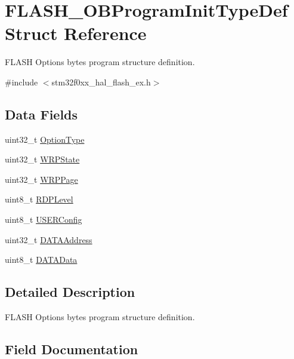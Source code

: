 \hypertarget{struct_f_l_a_s_h___o_b_program_init_type_def}{}\section{F\+L\+A\+S\+H\+\_\+\+O\+B\+Program\+Init\+Type\+Def Struct Reference}
\label{struct_f_l_a_s_h___o_b_program_init_type_def}


F\+L\+A\+SH Options bytes program structure definition.  




{\ttfamily \#include $<$stm32f0xx\+\_\+hal\+\_\+flash\+\_\+ex.\+h$>$}

\subsection*{Data Fields}
\begin{DoxyCompactItemize}
\item 
uint32\+\_\+t \hyperlink{struct_f_l_a_s_h___o_b_program_init_type_def_ac5941efaeb6bd9e3c0852613f990ebd8}{Option\+Type}
\item 
uint32\+\_\+t \hyperlink{struct_f_l_a_s_h___o_b_program_init_type_def_ab5ab320199482e9eb21dc8460501dea5}{W\+R\+P\+State}
\item 
uint32\+\_\+t \hyperlink{struct_f_l_a_s_h___o_b_program_init_type_def_ae5bf1ca4800efd0ac1f1663a4778766b}{W\+R\+P\+Page}
\item 
uint8\+\_\+t \hyperlink{struct_f_l_a_s_h___o_b_program_init_type_def_a02805f4f14c920bc29b38927556d3f45}{R\+D\+P\+Level}
\item 
uint8\+\_\+t \hyperlink{struct_f_l_a_s_h___o_b_program_init_type_def_ac4ab84c90f7a878b0b39ec1f3dda8ded}{U\+S\+E\+R\+Config}
\item 
uint32\+\_\+t \hyperlink{struct_f_l_a_s_h___o_b_program_init_type_def_a68b628b7adfda24edb7394fd56a798cc}{D\+A\+T\+A\+Address}
\item 
uint8\+\_\+t \hyperlink{struct_f_l_a_s_h___o_b_program_init_type_def_a57161ab82bc8d25561d71583827fd38c}{D\+A\+T\+A\+Data}
\end{DoxyCompactItemize}


\subsection{Detailed Description}
F\+L\+A\+SH Options bytes program structure definition. 

\subsection{Field Documentation}
\mbox{\label{struct_f_l_a_s_h___o_b_program_init_type_def_a68b628b7adfda24edb7394fd56a798cc}} 
